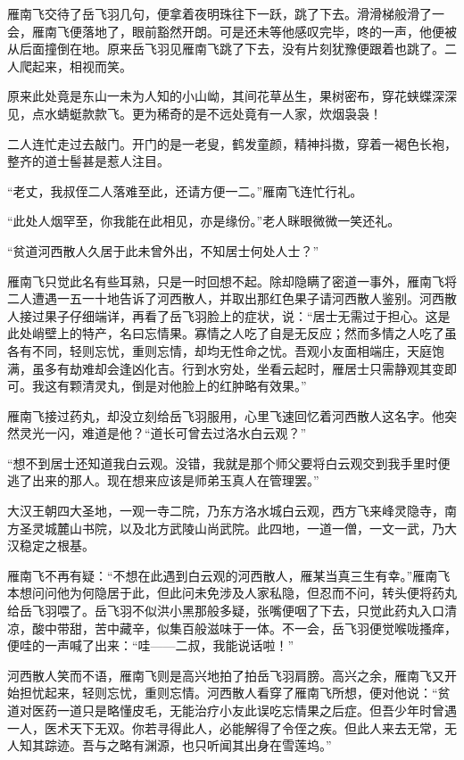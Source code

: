 雁南飞交待了岳飞羽几句，便拿着夜明珠往下一跃，跳了下去。滑滑梯般滑了一会，雁南飞便落地了，眼前豁然开朗。可是还未等他感叹完毕，咚的一声，他便被从后面撞倒在地。原来岳飞羽见雁南飞跳了下去，没有片刻犹豫便跟着也跳了。二人爬起来，相视而笑。

原来此处竟是东山一未为人知的小山岰，其间花草丛生，果树密布，穿花蛱蝶深深见，点水蜻蜓款款飞。更为稀奇的是不远处竟有一人家，炊烟袅袅！

二人连忙走过去敲门。开门的是一老叟，鹤发童颜，精神抖擞，穿着一褐色长袍，整齐的道士髻甚是惹人注目。

“老丈，我叔侄二人落难至此，还请方便一二。”雁南飞连忙行礼。

“此处人烟罕至，你我能在此相见，亦是缘份。”老人眯眼微微一笑还礼。

“贫道河西散人久居于此未曾外出，不知居士何处人士？”

雁南飞只觉此名有些耳熟，只是一时回想不起。除却隐瞒了密道一事外，雁南飞将二人遭遇一五一十地告诉了河西散人，并取出那红色果子请河西散人鉴别。河西散人接过果子仔细端详，再看了岳飞羽脸上的症状，说：“居士无需过于担心。这是此处峭壁上的特产，名曰忘情果。寡情之人吃了自是无反应；然而多情之人吃了虽各有不同，轻则忘忧，重则忘情，却均无性命之忧。吾观小友面相端庄，天庭饱满，虽多有劫难却会逢凶化吉。行到水穷处，坐看云起时，雁居士只需静观其变即可。我这有颗清灵丸，倒是对他脸上的红肿略有效果。”

雁南飞接过药丸，却没立刻给岳飞羽服用，心里飞速回忆着河西散人这名字。他突然灵光一闪，难道是他？“道长可曾去过洛水白云观？”

“想不到居士还知道我白云观。没错，我就是那个师父要将白云观交到我手里时便逃了出来的那人。现在想来应该是师弟玉真人在管理罢。”

大汉王朝四大圣地，一观一寺二院，乃东方洛水城白云观，西方飞来峰灵隐寺，南方圣灵城麓山书院，以及北方武陵山尚武院。此四地，一道一僧，一文一武，乃大汉稳定之根基。

雁南飞不再有疑：“不想在此遇到白云观的河西散人，雁某当真三生有幸。”雁南飞本想问问他为何隐居于此，但此问未免涉及人家私隐，但忍而不问，转头便将药丸给岳飞羽喂了。岳飞羽不似洪小黑那般多疑，张嘴便咽了下去，只觉此药丸入口清凉，酸中带甜，苦中藏辛，似集百般滋味于一体。不一会，岳飞羽便觉喉咙搔痒，便哇的一声喊了出来：“哇------二叔，我能说话啦！”

河西散人笑而不语，雁南飞则是高兴地拍了拍岳飞羽肩膀。高兴之余，雁南飞又开始担忧起来，轻则忘忧，重则忘情。河西散人看穿了雁南飞所想，便对他说：“贫道对医药一道只是略懂皮毛，无能治疗小友此误吃忘情果之后症。但吾少年时曾遇一人，医术天下无双。你若寻得此人，必能解得了令侄之疾。但此人来去无常，无人知其踪迹。吾与之略有渊源，也只听闻其出身在雪莲坞。”

